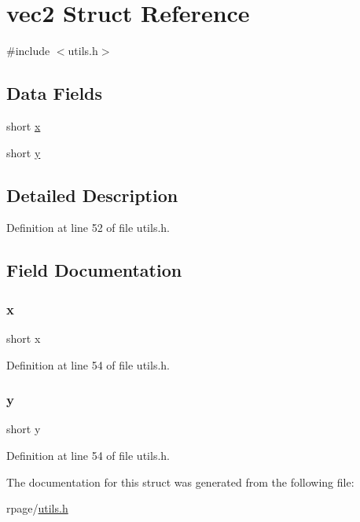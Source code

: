 \hypertarget{structvec2}{}\section{vec2 Struct Reference}
\label{structvec2}


{\ttfamily \#include $<$utils.\+h$>$}

\subsection*{Data Fields}
\begin{DoxyCompactItemize}
\item 
short \mbox{\hyperlink{structvec2_ad34729e4edc23ac502eaa17b188df67b}{x}}
\item 
short \mbox{\hyperlink{structvec2_a34769302b056076dd9f0cd95de8c5d2f}{y}}
\end{DoxyCompactItemize}


\subsection{Detailed Description}


Definition at line 52 of file utils.\+h.



\subsection{Field Documentation}
\mbox{\label{structvec2_ad34729e4edc23ac502eaa17b188df67b}} 
\subsubsection{\texorpdfstring{x}{x}}
{\footnotesize\ttfamily short x}



Definition at line 54 of file utils.\+h.

\mbox{\label{structvec2_a34769302b056076dd9f0cd95de8c5d2f}} 
\subsubsection{\texorpdfstring{y}{y}}
{\footnotesize\ttfamily short y}



Definition at line 54 of file utils.\+h.



The documentation for this struct was generated from the following file\+:\begin{DoxyCompactItemize}
\item 
rpage/\mbox{\hyperlink{utils_8h}{utils.\+h}}\end{DoxyCompactItemize}
